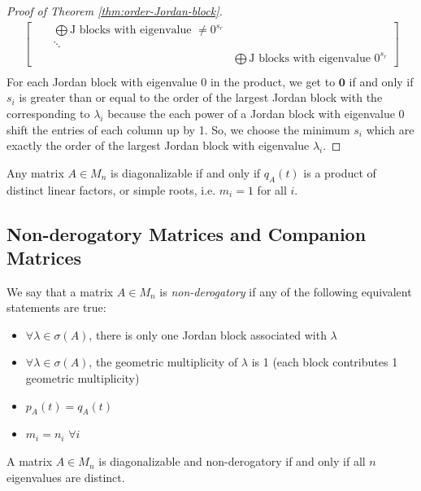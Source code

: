 \begin{proof}[Proof of Theorem \ref{thm:order-Jordan-block}]
\begin{align*}
\begin{bmatrix}
            & & \bigoplus \text{J blocks with eigenvalue }\not= 0^{s_r} \\
            & & \ddots & \\
            & & & \bigoplus \text{J blocks with eigenvalue 0}^{s_r}
            \end{bmatrix} \\
\end{align*}
For each Jordan block with eigenvalue 0 in the product, we get to $\mathbf{0}$ if and only if $s_i$ is greater than or equal to the order of the largest Jordan block with the corresponding to $\lambda_i$ because the each power of a Jordan block with eigenvalue 0 shift the entries of each column up by 1. So, we choose the minimum $s_i$ which are exactly the order of the largest Jordan block with eigenvalue $\lambda_i$.
\end{proof}

\begin{corollary}
\label{cor:diagonalizable-min-poly-simple-roots}
Any matrix $A \in M_n$ is diagonalizable if and only if $q_A(t)$ is a product of distinct linear factors, or simple roots, i.e. $m_i = 1$ for all $i$.
\end{corollary}


\subsection{Non-derogatory Matrices and Companion Matrices}
\begin{definition}
\label{def:nonderogatory}
We say that a matrix $A \in M_n$ is \textit{non-derogatory} if any of the following equivalent statements are true:
\begin{itemize}
    \item $\forall \lambda \in \sigma(A)$, there is only one Jordan block associated with $\lambda$
    \item $\forall \lambda \in \sigma(A)$, the geometric multiplicity of $\lambda$ is 1 (each block contributes 1 geometric multiplicity)
    \item $p_A(t) = q_A(t)$
    \item $m_i = n_i$ $\forall i$
\end{itemize}
\end{definition}

\begin{proposition}
\label{prop:diagonalizable-nonderogatory}
A matrix $A \in M_n$ is diagonalizable and non-derogatory if and only if all $n$ eigenvalues are distinct.
\end{proposition}

